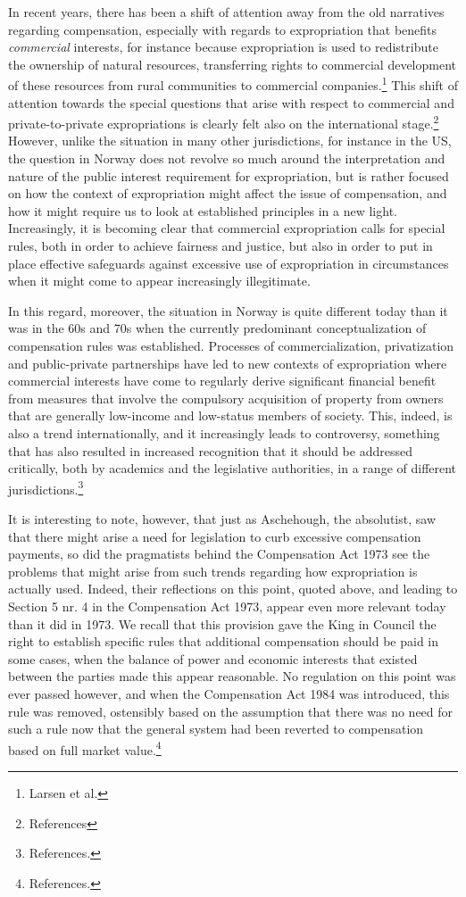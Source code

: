 In recent years, there has been a shift of attention away from the old narratives regarding compensation, especially with regards to expropriation that benefits \emph{commercial} interests, for instance because expropriation is used to redistribute the ownership of natural resources, transferring rights to commercial development of these resources from rural communities to commercial companies.\footnote{Larsen et al.} This shift of attention towards the special questions that arise with respect to commercial and private-to-private expropriations is clearly felt also on the international stage.\footnote{References} However, unlike the situation in many other jurisdictions, for instance in the US, the question in Norway does not revolve so much around the interpretation and nature of the public interest requirement for expropriation, but is rather focused on how the context of expropriation might affect the issue of compensation, and how it might require us to look at established principles in a new light. Increasingly, it is becoming clear that commercial expropriation calls for special rules, both in order to achieve fairness and justice, but also in order to put in place effective safeguards against excessive use of expropriation in circumstances when it might come to appear increasingly illegitimate.

In this regard, moreover, the situation in Norway is quite different today than it was in the 60s and 70s when the currently predominant conceptualization of compensation rules was established. Processes of commercialization, privatization and public-private partnerships have led to new contexts of expropriation where commercial interests have come to regularly derive significant financial benefit from measures that involve the compulsory acquisition of property from owners that are generally low-income and low-status members of society. This, indeed, is also a trend internationally, and it increasingly leads to controversy, something that has also resulted in increased recognition that it should be addressed critically, both by academics and the legislative authorities, in a range of different jurisdictions.\footnote{References.}

It is interesting to note, however, that just as Aschehough, the absolutist, saw that there might arise a need for legislation to curb excessive compensation payments, so did the pragmatists behind the Compensation Act 1973 see the problems that might arise from such trends regarding how expropriation is actually used. Indeed, their reflections on this point, quoted above, and leading to Section 5 nr. 4 in the Compensation Act 1973, appear even more relevant today than it did in 1973. We recall that this provision gave the King in Council the right to establish specific rules that additional compensation should be paid in some cases, when the balance of power and economic interests that existed between the parties made this appear reasonable. No regulation on this point was ever passed however, and when the Compensation Act 1984 was introduced, this rule was removed, ostensibly based on the assumption that there was no need for such a rule now that the general system had been reverted to compensation based on full market value.\footnote{References.}

